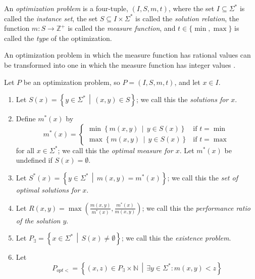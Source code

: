 \begin{definition}
  An \emph{optimization problem} is a four-tuple, $(I, S, m, t)$, where the set $I \subseteq \Sigma^*$ is called the \emph{instance set}, the set $S \subseteq I \times \Sigma^*$ is called the \emph{solution relation}, the function $m \colon S \to \mathbb{Z}^+$ is called the \emph{measure function}, and $t \in \{\min, \max\}$ is called the \emph{type} of the optimization.
\end{definition}

An optimization problem in which the measure function has rational values can be transformed into one in which the measure function has integer values \cite[page~23]{acgkmp99}.

\begin{definition}
  Let $P$ be an optimization problem, so $P = (I, S, m, t)$, and let $x \in I$.
  \begin{enumerate}
  \item Let $S(x)=\left\{ y \in \Sigma^* \,\middle|\, (x, y) \in S \right\}$; we call this the \emph{solutions for $x$}.
  \item Define $m^*(x)$ by
    \begin{displaymath}
      m^*(x) =
      \begin{cases}
        \min \left\{ m(x, y) \,\middle|\, y \in S(x) \right\} & \text{if } t = \min \\
        \max \left\{ m(x, y) \,\middle|\, y \in S(x) \right\} & \text{if } t = \max
      \end{cases}
    \end{displaymath}
    for all $x \in \Sigma^*$; we call this the \emph{optimal measure for $x$}.
    Let $m^*(x)$ be undefined if $S(x) = \emptyset$.
  \item Let $S^*(x) = \left\{ y \in \Sigma^* \,\middle|\, m(x, y) = m^*(x) \right\}$; we call this the \emph{set of optimal solutions for $x$}.
  \item Let $R(x, y) = \max \left(\frac{m(x, y)}{m^*(x)}, \frac{m^*(x)}{m(x, y)}\right)$; we call this the \emph{performance ratio of the solution $y$}.
  \item Let $P_\exists = \left\{ x \in \Sigma^* \,\middle|\, S(x) \neq \emptyset \right\}$; we call this the \emph{existence problem}.
  \item Let
    \begin{displaymath}
      P_{opt<} = \left\{ (x, z) \in P_\exists \times \mathbb{N} \,\middle|\, \exists y \in \Sigma^* \colon m(x, y) < z \right\}

\end{displaymath}
\end{enumerate}
\end{definition}
